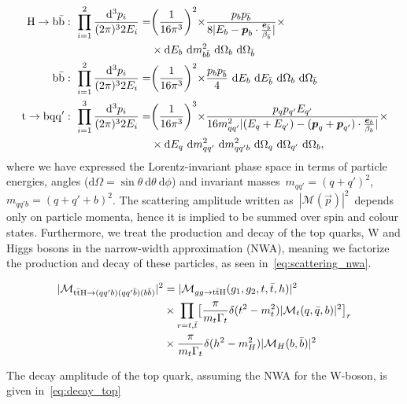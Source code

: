 \begin{align}
\label{eq:phase_space_jacobian}
\mathrm{H} \rightarrow \mathrm{b}\bar{\mathrm{b}}:\ \prod_{i=1}^{2} \frac{\mathrm{d}^3 p_i}{(2\pi)^3 2 E_i} =& \biggr(\frac{1}{16 \pi^3}\biggl)^2 \times \frac{p_b p_{\bar{b}}}{8 |E_b - \boldsymbol{p}_b \cdot \frac{\boldsymbol{e}_{\bar{b}}}{\beta_{\bar{b}}}|} \times \\
&\times\mathrm{d}E_{b}~\mathrm{d}m^2_{b\bar{b}}~\mathrm{d}\Omega_{b}~\mathrm{d}\Omega_{\bar{b}} \\
\mathrm{b}\bar{\mathrm{b}}:\ \prod_{i=1}^{2} \frac{\mathrm{d}^3 p_i}{(2\pi)^3 2 E_i} =& \biggr(\frac{1}{16 \pi^3}\biggl)^2 \times \frac{p_b p_{\bar{b}}}{4}~\mathrm{d}E_{b}~\mathrm{d}E_{\bar{b}}~\mathrm{d}\Omega_{b}~\mathrm{d}\Omega_{\bar{b}} \\
\mathrm{t} \rightarrow \mathrm{b}\mathrm{q}\mathrm{q}':\ \prod_{i=1}^{3} \frac{\mathrm{d}^3 p_i}{(2\pi)^3 2 E_i} =& \biggr(\frac{1}{16 \pi^3}\biggl)^3 \times \frac{p_q p_{q'} E_{q'}}{16 m_{qq'}^2 |(E_q + E_{q'}) - (\boldsymbol{p}_q + \boldsymbol{p}_{q'})\cdot \frac{\boldsymbol{e}_b}{\beta_b}|}\times\\
&\times\mathrm{d}E_{q}~\mathrm{d}m^2_{qq'}~\mathrm{d}m^2_{qq'b}~\mathrm{d}\Omega_{q}~\mathrm{d}\Omega_{q'}~\mathrm{d}\Omega_b,
\end{align}
where we have expressed the Lorentz-invariant phase space in terms of particle energies, angles ($\mathrm{d}\Omega = \sin{\theta}~\mathrm{d}\theta~\mathrm{d}\phi$) and invariant masses~$m_{qq'} = (q+q')^2$,~$m_{qq'b} = (q + q' + b)^2$.
The scattering amplitude written as~$|\mathcal{M}(\vec{p})|^2$~depends only on particle momenta, hence it is implied to be summed over spin and colour states. Furthermore, we treat the production and decay of the top quarks, W and Higgs bosons in the narrow-width approximation (NWA), meaning we factorize the production and decay of these particles, as seen in~\cref{eq:scattering_nwa}.

\begin{align}
\label{eq:scattering_nwa}
|\mathcal{M}_{\mathrm{t} \bar{\mathrm{t}} \mathrm{H} \rightarrow (qq'b) (qq'\bar{b}) (b\bar{b})}|^2 &= |\mathcal{M}_{gg \rightarrow \mathrm{t} \bar{\mathrm{t}} \mathrm{H}}(g_1, g_2, t, \bar{t}, h)|^2 \\
&\times \prod_{r = t,\bar{t}} \bigl[ \frac{\pi}{m_t \Gamma_t} \delta(t^2 - m_t^2) |\mathcal{M}_t(q,\bar{q},b)|^2 \bigr]_r \\
&\times \frac{\pi}{m_t \Gamma_t} \delta(h^2 - m_H^2) |\mathcal{M}_H(b,\bar{b})|^2
\end{align}

The decay amplitude of the top quark, assuming the NWA for the W-boson, is given in~\cref{eq:decay_top}


